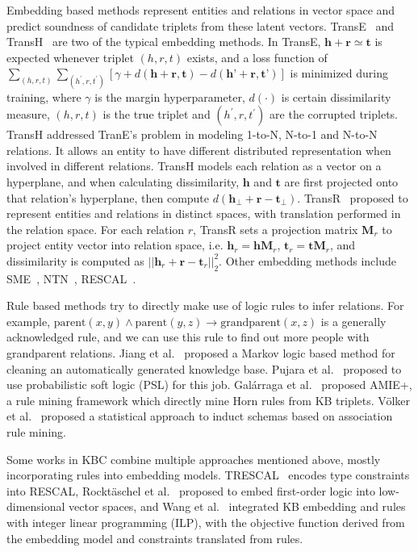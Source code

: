 Embedding based methods represent entities and relations in vector space and predict soundness of candidate triplets from these latent vectors. TransE~\cite{} and TransH~\cite{} are two of the typical embedding methods. In TransE, $\textbf{h} + \textbf{r} \simeq \textbf{t}$ is expected whenever triplet $(h, r, t)$ exists, and a loss function of $\sum_{(h,r,t)} \sum_{(h^{'},r,t^{'})} [\gamma + d(\textbf{h} + \textbf{r}, \textbf{t}) - d(\textbf{h'} + \textbf{r}, \textbf{t'})]$ is minimized during training, where $\gamma$ is the margin hyperparameter, $d(\cdot)$ is certain dissimilarity measure, $(h, r, t)$ is the true triplet and $(h^{'}, r, t^{'})$ are the corrupted triplets. TransH addressed TranE's problem in modeling 1-to-N, N-to-1 and N-to-N relations. It allows an entity to have different distributed representation when involved in different relations. TransH models each relation as a vector on a hyperplane, and when calculating dissimilarity, $\textbf{h}$ and $\textbf{t}$ are first projected onto that relation's hyperplane, then compute $d(\textbf{h}_{\bot} + \textbf{r} - \textbf{t}_{\bot})$. TransR~\cite{} proposed to represent entities and relations in distinct spaces, with translation performed in the relation space. For each relation $r$, TransR sets a projection matrix $\textbf{M}_r$ to project entity vector into relation space, i.e. $\textbf{h}_r = \textbf{hM}_r$, $\textbf{t}_r = \textbf{tM}_r$, and dissimilarity is computed as $||\textbf{h}_r + \textbf{r} - \textbf{t}_r||^2_2$. Other embedding methods include SME~\cite{}, NTN~\cite{}, RESCAL~\cite{}.

Rule based methods try to directly make use of logic rules to infer relations. For example, $\text{parent}(x, y) \land \text{parent}(y, z) \rightarrow \text{grandparent}(x, z)$ is a generally acknowledged rule, and we can use this rule to find out more people with grandparent relations. Jiang et al.~\shortcite{} proposed a Markov logic based method for cleaning an automatically generated knowledge base. Pujara et al.~\shortcite{} proposed to use probabilistic soft logic (PSL) for this job. Gal\'arraga et al.~\shortcite{} proposed AMIE+, a rule mining framework which directly mine Horn rules from KB triplets. V\"olker et al.~\shortcite{} proposed a statistical approach to induct schemas based on association rule mining.

Some works in KBC combine multiple approaches mentioned above, mostly incorporating rules into embedding models. TRESCAL~\cite{} encodes type constraints into RESCAL, Rockt\"aschel et al.~\shortcite{} proposed to embed first-order logic into low-dimensional vector spaces, and Wang et al.~\shortcite{} integrated KB embedding and rules with integer linear programming (ILP), with the objective function derived from the embedding model and constraints translated from rules. 

